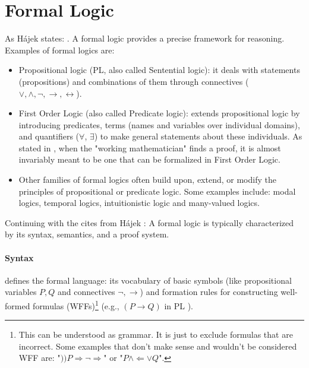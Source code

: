 \section{Formal Logic}
\label{app:form_log}

As Hájek states: \cite[p.1]{Hajek1998}. A formal logic provides a precise framework for reasoning. Examples of formal logics are:

\begin{itemize}
    \item Propositional logic (PL, also called Sentential logic)\cite[Ch.~6]{ConciseLogicBook}: it deals with statements (propositions) and combinations of them through connectives ($ \lor, \land, \neg, \rightarrow, \leftrightarrow$).
    \item First Order Logic (also called Predicate logic)\cite[Ch.~8]{ConciseLogicBook}: extends propositional logic by introducing predicates, terms (names and variables over individual domains), and quantifiers ($\forall$, $\exists$) to make general statements about these individuals. As stated in \cite[p.~67]{MathLogicBook}, when the "working mathematician" finds a proof, it is almost invariably meant to be one that can be formalized in First Order Logic.
    \item Other families of formal logics often build upon, extend, or modify the principles of propositional or predicate logic. Some examples include: modal logics, temporal logics, intuitionistic logic and many-valued logics.
\end{itemize}

Continuing with the cites from Hájek \cite[p.1]{Hajek1998}:  A formal logic is typically characterized by its syntax, semantics, and a proof system.

\paragraph{Syntax} defines the formal language: its vocabulary of basic symbols (like propositional variables $P, Q$ and connectives $\neg, \rightarrow$) and formation rules for constructing well-formed formulas (WFFs)\footnote{This can be understood as grammar. It is just to exclude formulas that are incorrect. Some examples that don't make sense and wouldn't be considered WFF are: "$))P\Rightarrow \neg\Rightarrow $" or "$P \land \Leftarrow \lor Q$".\cite[Sec.~2.3.3]{Agler2013SymbolicLogic}} (e.g., $(P \rightarrow Q)$ in PL \cite[Sec.~2.3.3]{Agler2013SymbolicLogic}).

